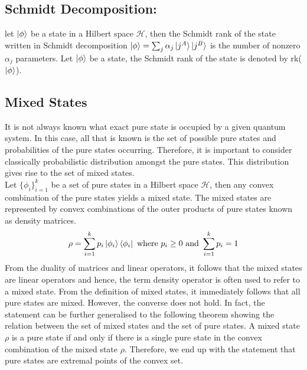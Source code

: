 
\subsection{Schmidt Decomposition:}
 let $\ket{\phi}$ be a state in a Hilbert space $\mathcal{H}$, then the Schmidt rank of the state written in Schmidt decomposition $\ket{\phi}=\sum_j \alpha_j \ket{j^A} \ket{j^B}$ is the number of nonzero $\alpha_j$ parameters. Let $\ket{\phi}$ be a state, the Schmidt rank of the state is denoted by rk($\ket{\phi}$).
\subsection{Mixed States}
It is not always known what exact pure state is occupied by a given
quantum system. In this case, all that is known is the set of possible pure states and probabilities of the pure states occurring. Therefore, it is important to consider classically probabilistic distribution
amongst the pure states. This distribution gives rise to the set of
mixed states.\\
Let $\{\phi_i\}_{i=1}^k$ be a set of pure states in a Hilbert space $\mathcal{H}$, then any convex combination of the pure states yields a mixed state. The mixed states are represented by convex combinations of the outer products of pure states known as density matrices.
\begin{equation}
    \rho=\sum_{i=1}^k p_i \ket{\phi_i}\bra{\phi_i} \text{ where } p_i \geq 0 \text{ and } \sum_{i=1}^k p_i = 1
\end{equation}
From the duality of matrices and linear operators, it follows that
the mixed states are linear operators and hence, the term density operator is often used to refer to a mixed state. From the definition of
mixed states, it immediately follows that all pure states are mixed.
However, the converse does not hold. In fact, the statement can be
further generalised to the following theorem showing the relation
between the set of mixed states and the set of pure states. A mixed state $\rho$ is a pure state if and only if there is a single
pure state in the convex combination of the mixed state $\rho$. Therefore, we end up with the statement that pure states are extremal points of the convex set. 

